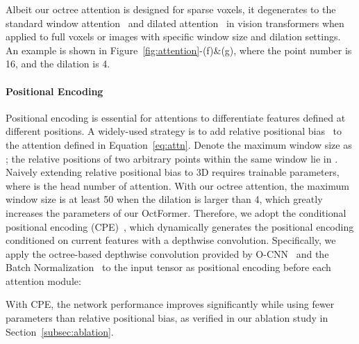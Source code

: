 \documentclass[acmtog,screen,authorversion]{acmart}
\begin{document}
Albeit our octree attention is designed for sparse voxels, it degenerates to the standard window attention~\cite{Liu2021a} and dilated attention~\cite{Hassani2022,Liu2022} in vision transformers when applied to full voxels or images with specific window size and dilation settings.
An example is shown in Figure~\ref{fig:attention}-(f)\&(g), where the point number is 16, and the dilation is 4.


\paragraph{Positional Encoding}
Positional encoding is essential for attentions to differentiate features defined at different positions.
A widely-used strategy is to add relative positional bias~\cite{Raffel2020,Liu2021a} to the attention defined in Equation~\ref{eq:attn}.
Denote the maximum window size as ; the relative positions of two arbitrary points within the same window lie in .
Naively extending relative positional bias to 3D requires  trainable parameters, where  is the head number of attention.
With our octree attention, the maximum window size is at least 50 when the dilation is larger than 4, which greatly increases the parameters of our OctFormer.
Therefore, we adopt the conditional positional encoding (CPE)~\cite{Chu2021,Dong2022,Wang2022a}, which dynamically generates the positional encoding conditioned on current features with a depthwise convolution.
Specifically, we apply the octree-based depthwise convolution provided by O-CNN~\cite{Wang2017} and the Batch Normalization~\cite{Loffe2015} to the input tensor  as positional encoding before each attention module:

With CPE, the network performance improves significantly while using fewer parameters than relative positional bias, as verified in our ablation study in Section~\ref{subsec:ablation}.
\end{document}
